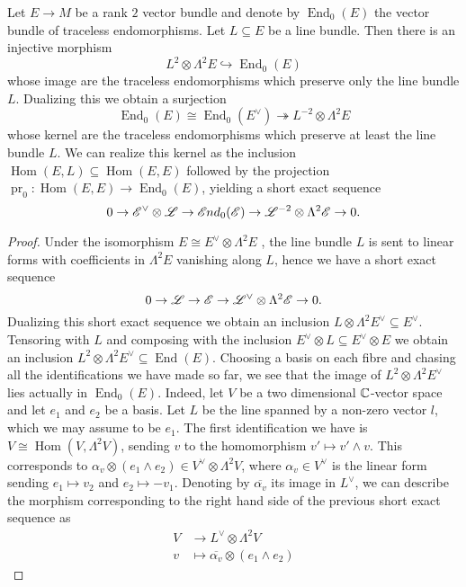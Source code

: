 \documentclass[A4paper, 12pt, british, reqno]{amsart}
\DeclareMathOperator{\Hom}{Hom}
\DeclareMathOperator{\End}{End}
\DeclareMathOperator{\pr}{pr}
\newcommand{\ot}{\otimes}
\newcommand{\dual}{^{\vee}}
\begin{document}
\begin{lm}\label{lm:linearalgebra}
    Let $E\to M$ be a rank $2$ vector bundle and denote by $\End_{0}(E)$ the vector bundle of traceless endomorphisms.
    Let $L\subseteq E$ be a line bundle.
    Then there is an injective morphism
    \[ L^{2}\ot \Lambda^{2}E\hookrightarrow \End_{0}(E) \]
    whose image are the traceless endomorphisms which preserve only the line bundle $L$.
    Dualizing this we obtain a surjection
    \[ \End_{0}(E)\cong \End_{0}(E\dual)\twoheadrightarrow L^{-2}\ot \Lambda^{2}E \]
    whose kernel are the traceless endomorphisms which preserve at least the line bundle $L$.
    We can realize this kernel as the inclusion $\Hom(E,L)\subseteq \Hom(E,E)$ followed by the projection $\pr_{0}\colon \Hom(E,E)\to \End_{0}(E)$, yielding a short exact sequence
    \[ 0\to \E\dual\ot \L\to \sEnd_{0}(\E)\to \L^{-2}\ot \Lambda^{2}\E \to 0. \]
    \begin{proof}	
	Under the isomorphism $E\cong E\dual \ot \Lambda^{2}E$ \cite[Exercise II.5.16]{har77}, the line bundle $L$ is sent to linear forms with coefficients in $\Lambda^{2}E$ vanishing along $L$, hence we have a short exact sequence
	\[ 0\to \L\to \E\to \L\dual \ot \Lambda^{2}\E\to 0. \]
	Dualizing this short exact sequence we obtain an inclusion $L\ot \Lambda^{2}E\dual \subseteq E\dual$.
	Tensoring with $L$ and composing with the inclusion $E\dual\ot L\subseteq E\dual \ot E$ we obtain an inclusion $L^{2}\ot \Lambda^{2}E\dual \subseteq \End(E)$.
	Choosing a basis on each fibre and chasing all the identifications we have made so far, we see that the image of $L^{2}\ot \Lambda^{2}E\dual$ lies actually in $\End_{0}(E)$.
	Indeed, let $V$ be a two dimensional $\mathbb{C}$-vector space and let $e_{1}$ and $e_{2}$ be a basis.
	Let $L$ be the line spanned by a non-zero vector $l$, which we may assume to be $e_{1}$.
	The first identification we have is $V\cong \Hom(V,\Lambda^{2}V)$, sending $v$ to the homomorphism $v'\mapsto v'\wedge v$.
	This corresponds to $\alpha_{v}\ot (e_{1}\wedge e_{2})\in V\dual\ot\Lambda^{2}V$, where $\alpha_{v}\in V\dual$ is the linear form sending $e_{1}\mapsto v_{2}$ and $e_{2}\mapsto -v_{1}$.
	Denoting by $\overline{\alpha_{v}}$ its image in $L\dual$, we can describe the morphism corresponding to the right hand side of the previous short exact sequence as
	\begin{align*}
	    V &\longrightarrow L\dual \ot \Lambda^{2}V \\
	    v &\longmapsto \overline{\alpha_{v}}\ot (e_{1}\wedge e_{2})
	\end{align*}

\end{proof}
\end{lm}
\end{document}
